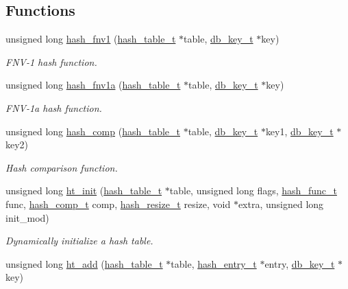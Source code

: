 \subsection*{Functions}
\begin{CompactItemize}
\item 
unsigned long \hyperlink{group__dbprim__hash_ga7}{hash\_\-fnv1} (\hyperlink{struct__hash__table__s}{hash\_\-table\_\-t} $\ast$table, \hyperlink{struct__db__key__s}{db\_\-key\_\-t} $\ast$key)
\begin{CompactList}\small\item\em FNV-1 hash function. \item\end{CompactList}\item 
unsigned long \hyperlink{group__dbprim__hash_ga8}{hash\_\-fnv1a} (\hyperlink{struct__hash__table__s}{hash\_\-table\_\-t} $\ast$table, \hyperlink{struct__db__key__s}{db\_\-key\_\-t} $\ast$key)
\begin{CompactList}\small\item\em FNV-1a hash function. \item\end{CompactList}\item 
unsigned long \hyperlink{group__dbprim__hash_ga9}{hash\_\-comp} (\hyperlink{struct__hash__table__s}{hash\_\-table\_\-t} $\ast$table, \hyperlink{struct__db__key__s}{db\_\-key\_\-t} $\ast$key1, \hyperlink{struct__db__key__s}{db\_\-key\_\-t} $\ast$key2)
\begin{CompactList}\small\item\em Hash comparison function. \item\end{CompactList}\item 
unsigned long \hyperlink{group__dbprim__hash_ga10}{ht\_\-init} (\hyperlink{struct__hash__table__s}{hash\_\-table\_\-t} $\ast$table, unsigned long flags, \hyperlink{group__dbprim__hash_ga4}{hash\_\-func\_\-t} func, \hyperlink{group__dbprim__hash_ga5}{hash\_\-comp\_\-t} comp, \hyperlink{group__dbprim__hash_ga6}{hash\_\-resize\_\-t} resize, void $\ast$extra, unsigned long init\_\-mod)
\begin{CompactList}\small\item\em Dynamically initialize a hash table. \item\end{CompactList}\item 
unsigned long \hyperlink{group__dbprim__hash_ga11}{ht\_\-add} (\hyperlink{struct__hash__table__s}{hash\_\-table\_\-t} $\ast$table, \hyperlink{struct__hash__entry__s}{hash\_\-entry\_\-t} $\ast$entry, \hyperlink{struct__db__key__s}{db\_\-key\_\-t} $\ast$key)

\end{CompactItemize}
